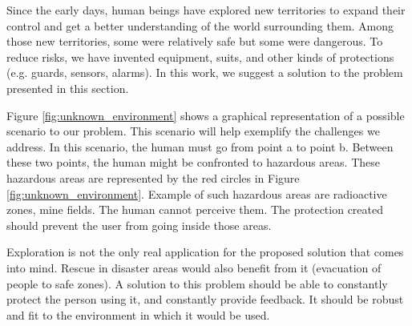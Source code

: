 \documentclass[oneside, a4paper, 12pt]{memoir}
\begin{document}
	Since the early days, human beings have explored new territories to expand their control and get a better understanding of the world surrounding them. Among those new territories, some were relatively safe but some were dangerous. To reduce risks, we have invented equipment, suits, and other kinds of protections (e.g. guards, sensors, alarms). In this work, we suggest a solution to the problem presented in this section.
	
	Figure \ref{fig:unknown_environment} shows a graphical representation of a possible scenario to our problem. This scenario will help exemplify the challenges we address. In this scenario, the human must go from point a to point b. Between these two points, the human might be confronted to hazardous areas. These hazardous areas are represented by the red circles in Figure \ref{fig:unknown_environment}. Example of such hazardous areas are radioactive zones, mine fields. The human cannot perceive them. The protection created should prevent the user from going inside those areas.
	
	Exploration is not the only real application for the proposed solution that comes into mind. Rescue in disaster areas would also benefit from it (evacuation of people to safe zones). A solution to this problem should be able to constantly protect the person using it, and constantly provide feedback. It should be robust and fit to the environment in which it would be used.
	
%			
%			
%			
	
\end{document}
